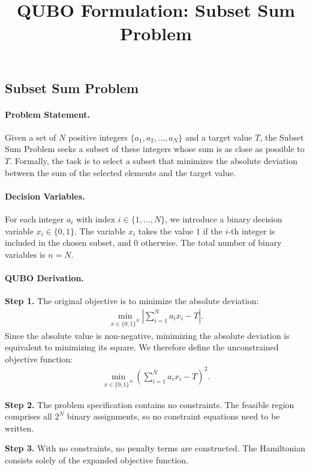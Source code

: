 \documentclass[12pt]{article}
\title{QUBO Formulation: Subset Sum Problem}
\date{}
\begin{document}
\maketitle

\subsection*{Subset Sum Problem}

\paragraph{Problem Statement.}
Given a set of $N$ positive integers $\{a_1, a_2, \dots, a_N\}$ and a target value $T$, the Subset Sum Problem seeks a subset of these integers whose sum is as close as possible to $T$. Formally, the task is to select a subset that minimizes the absolute deviation between the sum of the selected elements and the target value.

\paragraph{Decision Variables.}
For each integer $a_i$ with index $i \in \{1, \dots, N\}$, we introduce a binary decision variable $x_i \in \{0, 1\}$. The variable $x_i$ takes the value $1$ if the $i$-th integer is included in the chosen subset, and $0$ otherwise. The total number of binary variables is $n = N$.

\paragraph{QUBO Derivation.}
\textbf{Step 1.} The original objective is to minimize the absolute deviation:
\begin{align}
\min_{x \in \{0,1\}^N} \left| \sum_{i=1}^{N} a_i x_i - T \right|.
\end{align}
Since the absolute value is non-negative, minimizing the absolute deviation is equivalent to minimizing its square. We therefore define the unconstrained objective function:
\begin{align}
\min_{x \in \{0,1\}^N} \left( \sum_{i=1}^{N} a_i x_i - T \right)^2.
\end{align}

\textbf{Step 2.} The problem specification contains no constraints. The feasible region comprises all $2^N$ binary assignments, so no constraint equations need to be written.

\textbf{Step 3.} With no constraints, no penalty terms are constructed. The Hamiltonian consists solely of the expanded objective function.
\end{document}
